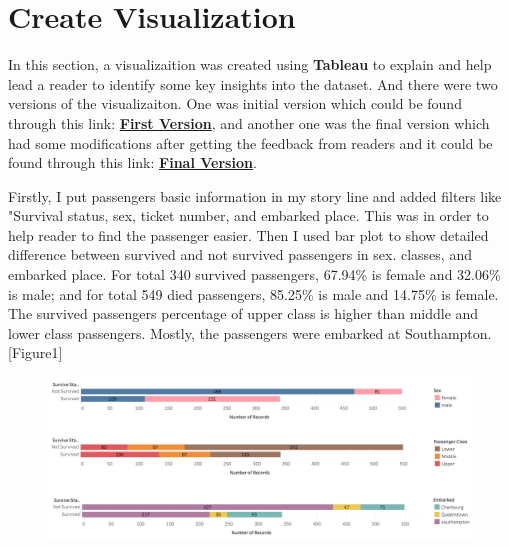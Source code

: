 \documentclass[10pt, a4paper, twocolumn]{article} %
\begin{document}
\section{Create Visualization}
In this section, a visualizaition was created using \textbf{Tableau} to explain and help lead a reader to identify some key insights into the dataset.  And there were two versions of the visualizaiton. One was initial version which could be found through this link: \href{https://public.tableau.com/profile/qingqing2461#!/vizhome/TitanicDataAnalysisReport_first_version/1_title}{\textbf{First Version}}, and another one was the final version which had some modifications after getting the feedback from readers and it could be found through this link: \href{https://public.tableau.com/profile/qingqing2461#!/vizhome/TitanicDataAnalysisReport/Data_report?publish=yes}{\textbf{Final Version}}.

Firstly, I put passengers basic information in my story line and added filters like "Survival status, sex, ticket number, and embarked place. This was in order to help reader to find the passenger easier. Then I used bar plot to show detailed difference between survived and not survived passengers in sex. classes, and embarked place. For total 340 survived passengers, 67.94\% is female and 32.06\% is male; and for total 549 died passengers, 85.25\% is male and 14.75\% is female. The survived passengers percentage of upper class is higher than middle and lower class passengers. Mostly, the passengers were embarked at Southampton.[Figure1]

\begin{figure}
	\includegraphics[width=\linewidth]{1-1.png} %
\end{figure}
\end{document}
